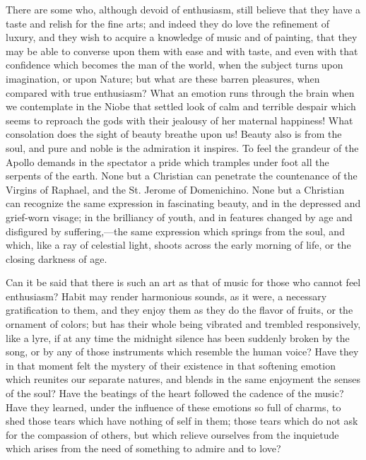 There are some who, although devoid of enthusiasm, still believe that
they have a taste and relish for the fine arts; and indeed they do
love the refinement of luxury, and they wish to acquire a knowledge of
music and of painting, that they may be able to converse upon them
with ease and with taste, and even with that confidence which becomes
the man of the world, when the subject turns upon imagination, or upon
Nature; but what are these barren pleasures, when compared with true
enthusiasm? What an emotion runs through the brain when we contemplate
in the Niobe that settled look of calm and terrible despair which
seems to reproach the gods with their jealousy of her maternal
happiness! What consolation does the sight of beauty breathe upon us!
Beauty also is from the soul, and pure and noble is the admiration it
inspires. To feel the grandeur of the Apollo demands in the spectator
a pride which tramples under foot all the serpents of the earth. None
but a Christian can penetrate the countenance of the Virgins of
Raphael, and the St. Jerome of Domenichino. None but a Christian can
recognize the same expression in fascinating beauty, and in the
depressed and grief-worn visage; in the brilliancy of youth, and in
features changed by age and disfigured by suffering,---the same
expression which springs from the soul, and which, like a ray of
celestial light, shoots across the early morning of life, or the
closing darkness of age.

Can it be said that there is such an art as that of music
for those who cannot feel enthusiasm? Habit may render harmonious
sounds, as it were, a necessary gratification to them, and they enjoy
them as they do the flavor of fruits, or the ornament of colors; but
has their whole being vibrated and trembled responsively, like a lyre,
if at any time the midnight silence has been suddenly broken by the
song, or by any of those instruments which resemble the human voice?
Have they in that moment felt the mystery of their existence in that
softening emotion which reunites our separate natures, and blends in
the same enjoyment the senses of the soul? Have the beatings of the
heart followed the cadence of the music? Have they learned, under the
influence of these emotions so full of charms, to shed those tears
which have nothing of self in them; those tears which do not ask for
the compassion of others, but which relieve ourselves from the
inquietude which arises from the need of something to admire and to
love?

